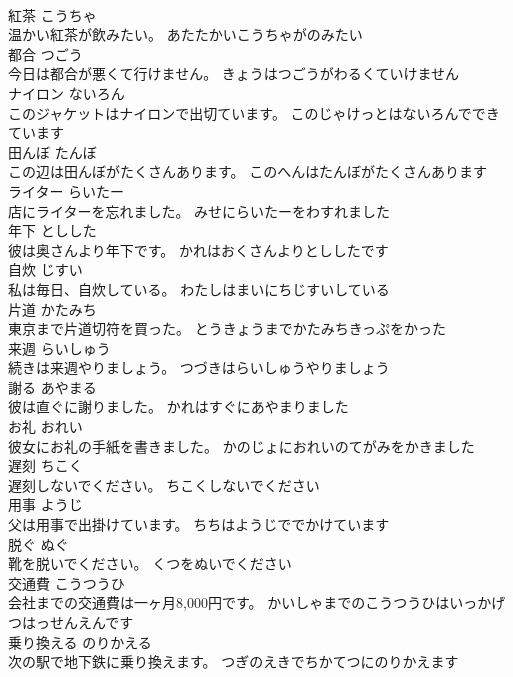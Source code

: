 \documentclass[8pt]{extreport}
\begin{document}
\begin{CJK}{UTF8}{min}
\\	紅茶	こうちゃ	
\\	温かい紅茶が飲みたい。	あたたかいこうちゃがのみたい	
\\	都合	つごう	
\\	今日は都合が悪くて行けません。	きょうはつごうがわるくていけません	
\\	ナイロン	ないろん	
\\	このジャケットはナイロンで出切ています。	このじゃけっとはないろんでできています	
\\	田んぼ	たんぼ	
\\	この辺は田んぼがたくさんあります。	このへんはたんぼがたくさんあります	
\\	ライター	らいたー	
\\	店にライターを忘れました。	みせにらいたーをわすれました	
\\	年下	としした	
\\	彼は奥さんより年下です。	かれはおくさんよりとししたです	
\\	自炊	じすい	
\\	私は毎日、自炊している。	わたしはまいにちじすいしている	
\\	片道	かたみち	
\\	東京まで片道切符を買った。	とうきょうまでかたみちきっぷをかった	
\\	来週	らいしゅう	
\\	続きは来週やりましょう。	つづきはらいしゅうやりましょう	
\\	謝る	あやまる	
\\	彼は直ぐに謝りました。	かれはすぐにあやまりました	
\\	お礼	おれい	
\\	彼女にお礼の手紙を書きました。	かのじょにおれいのてがみをかきました	
\\	遅刻	ちこく	
\\	遅刻しないでください。	ちこくしないでください	
\\	用事	ようじ	
\\	父は用事で出掛けています。	ちちはようじででかけています	
\\	脱ぐ	ぬぐ	
\\	靴を脱いでください。	くつをぬいでください	
\\	交通費	こうつうひ	
\\	会社までの交通費は一ヶ月8,000円です。	かいしゃまでのこうつうひはいっかげつはっせんえんです	
\\	乗り換える	のりかえる	
\\	次の駅で地下鉄に乗り換えます。	つぎのえきでちかてつにのりかえます	

\end{CJK}
\end{document}
